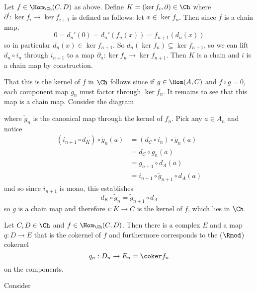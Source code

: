 \documentclass[12pt]{article}
\begin{document}
\begin{sol}
\begin{prf}
	Let $f\in\Hom_{\Ch}(C,D)$ as above. Define $K=(\ker f_i,\partial)\in\Ch$ where 
	$\partial^i:\ker f_i\to \ker f_{i+1}$ is defined as follows: let $x\in\ker f_n$. Then since $f$
	is a chain map, 
	\[0=d_n'(0)=d_n'(f_n(x))=f_{n+1}(d_n(x))\]
	so in particular $d_n(x)\in\ker f_{n+1}$. So $d_n(\ker f_n)\subseteq \ker f_{n+1}$, so we can lift
	$d_n\circ i_n$ through $i_{n+1}$ to a map $\partial_n:\ker f_n\to \ker f_{n+1}$. Then $K$ is a chain 
	and $i$ is a chain map by construction.
	
	That this is the kernel of $f$ in $\Ch$ follows since if $g\in\Hom(A,C)$ and $f\circ g=0$, each component
	map $g_n$ must factor through $\ker f_n$. It remains to see that this map is a chain map. Consider the diagram

	\begin{center}
	\end{center}

	\noindent where $\tilde g_n$ is the canonical map through the kernel of $f_n$. Pick any $a\in A_n$ and notice
	\begin{align*}
		(i_{n+1}\circ d_K)\circ \tilde g_n(a)&=(d_C\circ i_n)\circ \tilde g_n(a) \\
		&= d_C\circ g_n(a)\\
		&=g_{n+1}\circ d_A(a)\\
		&=i_{n+1}\circ \tilde g_{n+1}\circ d_A(a)
	\end{align*}
	and so since $i_{n+1}$ is mono, this establishes
	\[d_K\circ\tilde g_n = \tilde g_{n+1}\circ d_A\]
	so $\tilde g$ is a chain map and therefore $i:K\to C$ is the kernel of $f$, which lies in $\Ch$.
	\end{prf}

	\brk
	\begin{lem}\label{lem-chain-coker}
		Let $C,D\in\Ch$ and $f\in\Hom_{\Ch}(C,D)$. Then there is a complex $E$ and a map $q:D\to E$ 
		that is the cokernel of $f$ and furthermore corresponds to the ($\Rmod$) cokernel 
		\[q_n:D_n\to E_n=\coker f_n\]
		on the components.
	\end{lem}
	\begin{prf}
	Consider
	

\end{prf}
\end{sol}
\end{document}
